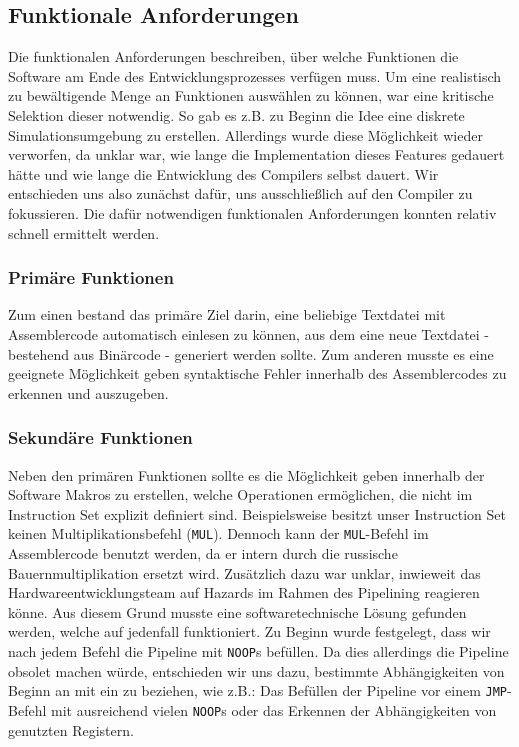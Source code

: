 \documentclass[paper=a4,fontsize=11pt,twocolumn]{scrreprt}
\begin{document}
\subsection{Funktionale Anforderungen}
\label{subsec:functionale_anforderungen}

Die funktionalen Anforderungen beschreiben, über welche Funktionen die Software am Ende des Entwicklungsprozesses verfügen muss.
Um eine realistisch zu bewältigende Menge an Funktionen auswählen zu können, war eine  kritische Selektion dieser notwendig.
So gab es z.B. zu Beginn die Idee eine diskrete Simulationsumgebung zu erstellen. Allerdings wurde diese Möglichkeit wieder verworfen, da unklar war, wie lange die Implementation dieses Features gedauert hätte und wie lange die Entwicklung des Compilers selbst dauert.
Wir entschieden uns also zunächst dafür, uns ausschließlich auf den Compiler zu fokussieren.
Die dafür notwendigen funktionalen Anforderungen konnten relativ schnell ermittelt werden.

\subsubsection{Primäre Funktionen}

Zum einen bestand das primäre Ziel darin, eine beliebige Textdatei mit Assemblercode automatisch einlesen zu können, aus dem eine neue Textdatei - bestehend aus Binärcode - generiert werden sollte.
Zum anderen musste es eine geeignete Möglichkeit geben syntaktische Fehler innerhalb des Assemblercodes zu erkennen und auszugeben.

\subsubsection{Sekundäre Funktionen}

Neben den primären Funktionen sollte es die Möglichkeit geben innerhalb der Software Makros zu erstellen, welche Operationen ermöglichen, die nicht im Instruction Set explizit definiert sind.
Beispielsweise besitzt unser Instruction Set keinen Multiplikationsbefehl (\texttt{MUL}).
Dennoch kann der \texttt{MUL}-Befehl im Assemblercode benutzt werden, da er intern durch die russische Bauernmultiplikation ersetzt wird.
Zusätzlich dazu war unklar, inwieweit das Hardwareentwicklungsteam auf Hazards im Rahmen des Pipelining reagieren könne.
Aus diesem Grund musste eine softwaretechnische Lösung  gefunden werden, welche auf jedenfall funktioniert.
Zu Beginn wurde festgelegt, dass wir nach jedem Befehl die Pipeline mit \texttt{NOOP}s befüllen.
Da dies allerdings die Pipeline obsolet machen würde, entschieden wir uns dazu, bestimmte Abhängigkeiten von Beginn an mit ein zu beziehen, wie z.B.: Das Befüllen der Pipeline vor einem \texttt{JMP}-Befehl mit ausreichend vielen \texttt{NOOP}s oder das Erkennen der Abhängigkeiten von genutzten Registern.
\end{document}
